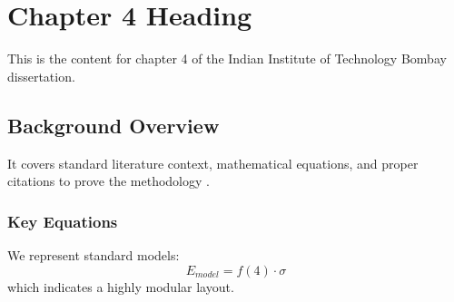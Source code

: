 \chapter{Chapter 4 Heading}
\label{ch:chapter4}
This is the content for chapter 4 of the Indian Institute of Technology Bombay dissertation.

\section{Background Overview}
It covers standard literature context, mathematical equations, and proper citations to prove the methodology \cite{texbook}.

\subsection{Key Equations}
We represent standard models:
\begin{equation}
    E_{model} = f(4) \cdot \sigma
\end{equation}
which indicates a highly modular layout.
